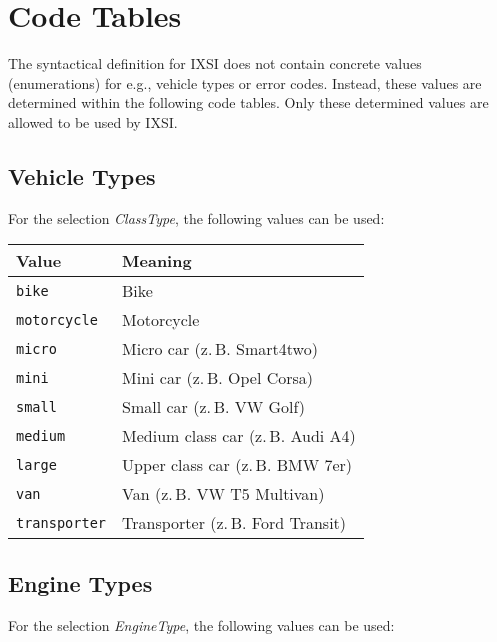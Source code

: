 \chapter{Code Tables}
\label{cha:CodeTabellen}
The syntactical definition for IXSI does not contain concrete values (enumerations) for e.g., vehicle types or error codes. Instead, these values are determined within the following code tables. Only these determined values are allowed to be used by IXSI. 

\section{Vehicle Types}
\label{sec:CodeTabellen:ClassType}
For the selection \emph{ClassType}, the following values can be used:

\begin{flushleft}
\begin{tabularx}{\linewidth}{l>{\raggedright\arraybackslash}X}
\toprule
Value & Meaning\\
\midrule
\verb|bike| & Bike\\
\verb|motorcycle| & Motorcycle\\
\verb|micro| & Micro car (z.\,B. Smart4two)\\
\verb|mini| & Mini car (z.\,B. Opel Corsa)\\
\verb|small| & Small car (z.\,B. VW Golf)\\
\verb|medium| & Medium class car (z.\,B. Audi A4)\\
\verb|large| & Upper class car (z.\,B. BMW 7er)\\
\verb|van| & Van (z.\,B. VW T5 Multivan)\\
\verb|transporter| & Transporter (z.\,B. Ford Transit)\\
\bottomrule
\end{tabularx}
\end{flushleft}

\section{Engine Types}
\label{sec:CodeTabellen:EngineType}
For the selection \emph{EngineType}, the following values can be used:

